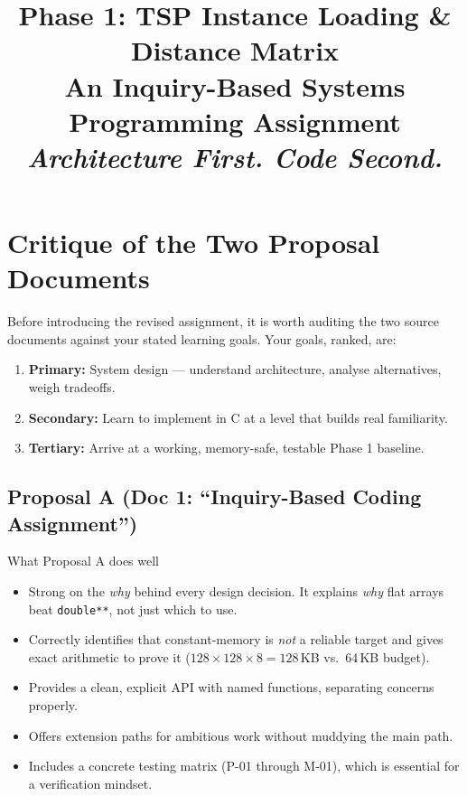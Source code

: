 \documentclass[11pt]{article}
\title{
  \textbf{\large Phase 1: TSP Instance Loading \& Distance Matrix}\\[4pt]
  \large An Inquiry-Based Systems Programming Assignment\\[8pt]
  \normalsize\textit{Architecture First. Code Second.}
}
\author{}
\date{}
\begin{document}
\maketitle
\tableofcontents
\newpage

\section{Critique of the Two Proposal Documents}

Before introducing the revised assignment, it is worth auditing the two source documents against your stated learning goals. Your goals, ranked, are:

\begin{enumerate}[label=\textbf{\arabic*.}]
  \item \textbf{Primary:} System design --- understand architecture, analyse alternatives, weigh tradeoffs.
  \item \textbf{Secondary:} Learn to implement in C at a level that builds real familiarity.
  \item \textbf{Tertiary:} Arrive at a working, memory-safe, testable Phase 1 baseline.
\end{enumerate}

\subsection{Proposal A (Doc 1: ``Inquiry-Based Coding Assignment'')}

\begin{goodbox}{What Proposal A does well}
\begin{itemize}
  \item Strong on the \emph{why} behind every design decision. It explains \emph{why} flat arrays beat \texttt{double**}, not just which to use.
  \item Correctly identifies that constant-memory is \emph{not} a reliable target and gives exact arithmetic to prove it ($128 \times 128 \times 8 = 128$\,KB vs.\ 64\,KB budget).
  \item Provides a clean, explicit API with named functions, separating concerns properly.
  \item Offers extension paths for ambitious work without muddying the main path.
  \item Includes a concrete testing matrix (P-01 through M-01), which is essential for a verification mindset.
\end{itemize}
\end{goodbox}
\end{document}
